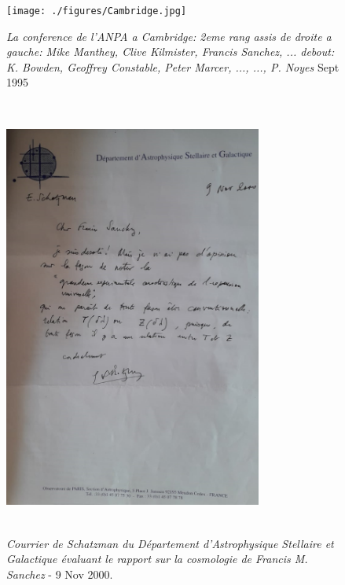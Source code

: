 \documentclass[a4paper,12pt]{article}
\begin{document}
\begin{appendix}
\begin{figure}
\centering
\texttt{[image: ./figures/Cambridge.jpg]}
\caption[La conference de l'ANPA a Cambridge en 1995]{\textit{La conference de l'ANPA a Cambridge: 2eme rang assis de droite a gauche: Mike Manthey, Clive Kilmister, Francis Sanchez, ... debout: K. Bowden, Geoffrey Constable, Peter Marcer, ..., ..., P. Noyes} Sept 1995 }
\label{fig:11:figure11}
\end{figure}



\begin{figure}
\centering
\includegraphics[width=8.5cm,height=14.5cm]{./figures/schatzmann.png}
\caption[Courrier d'evaluation de Schatzman]{\textit{Courrier de Schatzman du Département d'Astrophysique Stellaire et Galactique évaluant le rapport sur la cosmologie de Francis M. Sanchez} - 9 Nov 2000.} 
\label{fig:12:figure12}
\end{figure}



\end{appendix}
\end{document}
